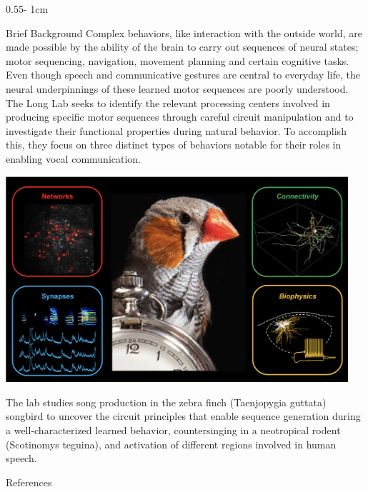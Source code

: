 \documentclass{../psuposter}
\begin{document}
\begin{frame}
\begin{columns}[t, totalwidth=\textwidth]
\begin{column}{0.55\textwidth - 1cm}
    \begin{block}{Brief Background}
    	Complex behaviors, like interaction with the outside world, are made possible by the ability of the brain to carry out sequences of neural states; motor sequencing, navigation, movement planning and certain cognitive tasks. Even though speech and communicative gestures are central to everyday life, the neural underpinnings of these learned motor sequences are poorly understood. The Long Lab seeks to identify the relevant processing centers involved in producing specific motor sequences through careful circuit manipulation and to investigate their functional properties during natural behavior. To accomplish this, they focus on three distinct types of behaviors notable for their roles in enabling vocal communication.  
    	\cite{longLocalAxonalConduction2020} 
        \begin{center}
		   	\includegraphics[width=0.95\textwidth]{images/bird}    		
    	\end{center}
		The lab studies song production in the zebra finch (Taenjopygia guttata) songbird to uncover the circuit principles that enable sequence generation during a well-characterized learned behavior, countersinging in a neotropical rodent (Scotinomys teguina), and activation of different regions involved in human speech. 
		\cite{longMorphologicalCharacterizationHVC2018} 
    \end{block}


    \begin{block}{References}
        
%        
		
    \end{block}


\end{column}
\end{columns}
\end{frame}
\end{document}
